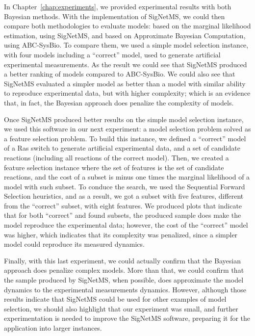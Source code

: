 In Chapter~\ref{chap:experiments}, we provided experimental results with both Bayesian methods.
With the implementation of SigNetMS, we could then compare both
methodologies to evaluate models: based on the marginal likelihood
estimation, using SigNetMS, and based on Approximate Bayesian
Computation, using ABC-SysBio. To compare them, we used a simple model
selection instance, with four models including a ``correct'' model, used
to generate artificial experimental measurements. As the result we
could see that SigNetMS produced a better ranking of models compared to
ABC-SysBio. We could also see that SigNetMS evaluated a simpler model as
better than a model with similar ability to reproduce experimental data,
but with higher complexity; which is an evidence that, in fact, the
Bayesian approach does penalize the complexity of models.

Once SigNetMS produced better results on the simple model selection
instance, we used this software in our next experiment: a model
selection problem solved as a feature selection problem. To build this
instance, we defined a ``correct'' model of a Ras switch to generate
artificial experimental data, and a set of candidate reactions
(including all reactions of the correct model). Then, we created a
feature selection instance where the set of features is the set of
candidate reactions, and the cost of a subset is minus one times the
marginal likelihood of a model with such subset. To conduce the search,
we used the Sequential Forward Selection heuristics, and as a result, we
got a subset with five features, different from the ``correct'' subset,
with eight features. We produced plots that indicate that for both
``correct'' and found subsets, the produced sample does make the model
reproduce the experimental data; however, the cost of the ``correct''
model was higher, which indicates that its complexity was penalized,
since a simpler model could reproduce its measured dynamics.

Finally, with this last experiment, we could actually confirm that the
Bayesian approach does penalize complex models. More than that, we could
confirm that the sample produced by SigNetMS, when possible, does
approximate the model dynamics to the experimental measurements
dynamics. However, although those results indicate that SigNetMS could be used for
other examples of model selection, we should also highlight that our
experiment was small, and further experimentation is needed to improve
the SigNetMS software, preparing it for the application into larger instances.


